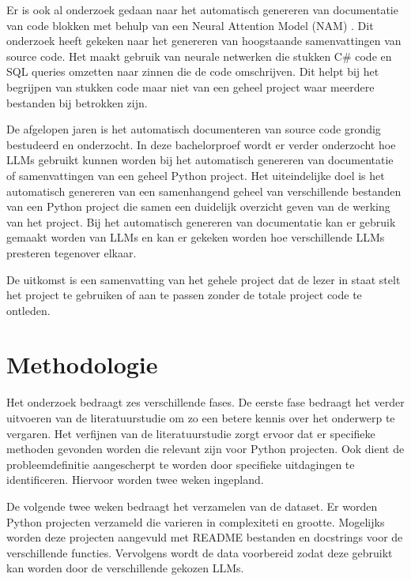 Er is ook al onderzoek gedaan naar het automatisch genereren van documentatie van code blokken met behulp van een Neural Attention Model (NAM) \autocite{IyerEtAl2016}.
Dit onderzoek heeft gekeken naar het genereren van hoogstaande samenvattingen van source code. 
Het maakt gebruik van neurale netwerken die stukken C\# code en SQL queries omzetten naar zinnen die de code omschrijven. 
Dit helpt bij het begrijpen van stukken code maar niet van een geheel project waar meerdere bestanden bij betrokken zijn.

De afgelopen jaren is het automatisch documenteren van source code grondig bestudeerd en onderzocht. 
In deze bachelorproef wordt er verder onderzocht hoe LLMs gebruikt kunnen worden bij het automatisch genereren van documentatie of samenvattingen van een geheel Python project.
Het uiteindelijke doel is het automatisch genereren van een samenhangend geheel van verschillende bestanden van een Python project die samen een duidelijk overzicht geven van de werking van het project.
Bij het automatisch genereren van documentatie kan er gebruik gemaakt worden van LLMs en kan er gekeken worden hoe verschillende LLMs presteren tegenover elkaar. 

De uitkomst is een samenvatting van het gehele project dat de lezer in staat stelt het project te gebruiken of aan te passen zonder de totale project code te ontleden.

\section{Methodologie}%
\label{sec:methodologie}

Het onderzoek bedraagt zes verschillende fases. 
De eerste fase bedraagt het verder uitvoeren van de literatuurstudie om zo een betere kennis over het onderwerp te vergaren.
Het verfijnen van de literatuurstudie zorgt ervoor dat er specifieke methoden gevonden worden die relevant zijn voor Python projecten.
Ook dient de probleemdefinitie aangescherpt te worden door specifieke uitdagingen te identificeren.
Hiervoor worden twee weken ingepland.

De volgende twee weken bedraagt het verzamelen van de dataset. Er worden Python projecten verzameld die varieren in complexiteti en grootte.
Mogelijks worden deze projecten aangevuld met README bestanden en docstrings voor de verschillende functies.
Vervolgens wordt de data voorbereid zodat deze gebruikt kan worden door de verschillende gekozen LLMs.

